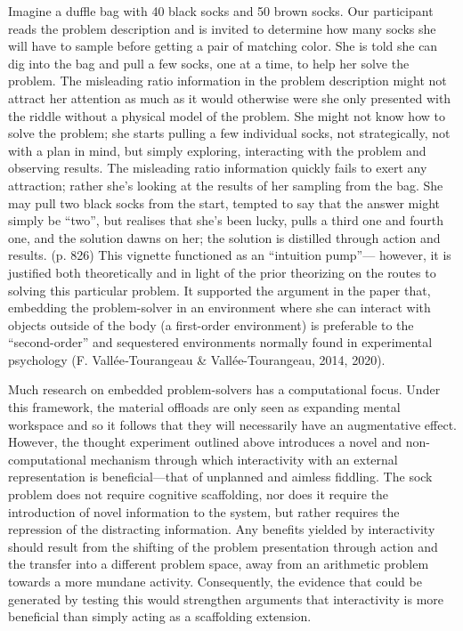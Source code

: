 \documentclass[twocolumn, serif, empirical, authordate]{jote-article}
\begin{document}
Imagine a duffle bag with 40 black socks and 50 brown socks. Our participant reads the problem description and is invited to determine how many socks she will have to sample before getting a pair of matching color. She is told she can dig into the bag and pull a few socks, one at a time, to help her solve the problem. The misleading ratio information in the problem description might not attract her attention as much as it would otherwise were she only presented with the riddle without a physical model of the problem. She might not know how to solve the problem; she starts pulling a few individual socks, not strategically, not with a plan in mind, but simply exploring, interacting with the problem and observing results. The misleading ratio information quickly fails to exert any attraction; rather she's looking at the results of her sampling from the bag. She may pull two black socks from the start, tempted to say that the answer might simply be ``two'', but realises that she's been lucky, pulls a third one and fourth one, and the solution dawns on her; the solution is distilled through action and results. (p. 826) 
This vignette functioned as an ``intuition pump''--- however, it is justified both theoretically and in light of the prior theorizing on the routes to solving this particular problem. It supported the argument in the paper that, embedding the problem-solver in an environment where she can interact with objects outside of the body (a first-order environment) is preferable to the ``second-order'' and sequestered environments normally found in experimental psychology (F.
Vallée‐Tourangeau \& Vallée-Tourangeau, 2014, 2020).

Much research on embedded problem-solvers has a computational focus.
Under this framework, the material offloads are only seen as expanding mental workspace and so it follows that they will necessarily have an augmentative effect. However, the thought experiment outlined above introduces a novel and non-computational mechanism through which interactivity with an external representation is beneficial---that of unplanned and aimless fiddling. The sock problem does not require cognitive scaffolding, nor does it require the introduction of novel information to the system, but rather requires the repression of the distracting information. Any benefits yielded by interactivity should result from the shifting of the problem presentation through action and the transfer into a different problem space, away from an arithmetic problem towards a more mundane activity. Consequently, the evidence that could be generated by testing this would strengthen arguments that interactivity is more beneficial than simply acting as a scaffolding extension.
\end{document}
